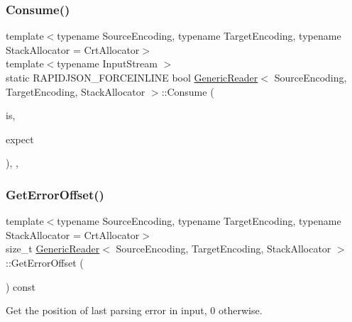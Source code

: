 \mbox{\label{classGenericReader_a5552ffdca0c3872ffeab6d35ea7038c2}} 
\subsubsection{\texorpdfstring{Consume()}{Consume()}}
{\footnotesize\ttfamily template$<$typename Source\+Encoding, typename Target\+Encoding, typename Stack\+Allocator = Crt\+Allocator$>$ \\
template$<$typename Input\+Stream $>$ \\
static R\+A\+P\+I\+D\+J\+S\+O\+N\+\_\+\+F\+O\+R\+C\+E\+I\+N\+L\+I\+NE bool \hyperlink{classGenericReader}{Generic\+Reader}$<$ Source\+Encoding, Target\+Encoding, Stack\+Allocator $>$\+::Consume (\begin{DoxyParamCaption}\item[{Input\+Stream \&}]{is,  }\item[{typename Input\+Stream\+::\+Ch}]{expect }\end{DoxyParamCaption})\hspace{0.3cm}{\ttfamily [inline]}, {\ttfamily [static]}, {\ttfamily [private]}}

\mbox{\label{classGenericReader_ae9008523ccd06d839a57335835cb4091}} 
\subsubsection{\texorpdfstring{Get\+Error\+Offset()}{GetErrorOffset()}}
{\footnotesize\ttfamily template$<$typename Source\+Encoding, typename Target\+Encoding, typename Stack\+Allocator = Crt\+Allocator$>$ \\
size\+\_\+t \hyperlink{classGenericReader}{Generic\+Reader}$<$ Source\+Encoding, Target\+Encoding, Stack\+Allocator $>$\+::Get\+Error\+Offset (\begin{DoxyParamCaption}{ }\end{DoxyParamCaption}) const\hspace{0.3cm}{\ttfamily [inline]}}



Get the position of last parsing error in input, 0 otherwise. 

